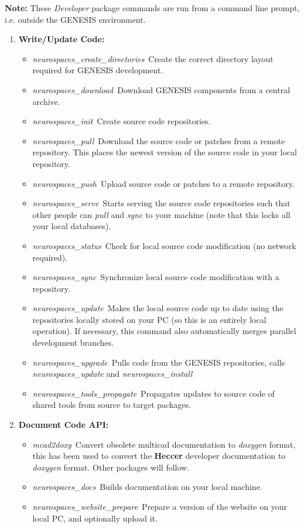 \documentclass[12pt]{article}
\begin{document}
{\bf Note:} These {\it Developer} package commands are run from a command line prompt, i.e. outside the GENESIS environment.

\begin{enumerate}
   \item {\bf Write/Update Code:}
   \begin{itemize}
      \item {\it neurospaces\_create\_directories}\,\,\,Create the correct directory layout required for GENESIS development.
      \item {\it neurospaces\_download}\,\,\,Download GENESIS components from a central archive.
      \item {\it neurospaces\_init}\,\,\,Create source code repositories.
      \item {\it neurospaces\_pull}\,\,\,Download the source code or patches from a remote repository. This places the newest version of the source 
      code in your local repository.
      \item {\it neurospaces\_push}\,\,\,Upload source code or patches to a remote repository.
      \item {\it neurospaces\_serve}\,\,\,Starts serving the source code repositories such that other people can {\it pull} and {\it sync} to your machine (note that this locks all your local databases).
      \item {\it neurospaces\_status}\,\,\,Check for local source code modification (no network required).
      \item {\it neurospaces\_sync}\,\,\,Synchronize local source code modification with a repository.
      \item {\it neurospaces\_update}\,\,\,Makes the local source code up to date using the repositories locally stored on your PC (so this is an entirely local operation). If necessary, this command also automatically merges parallel development branches.
      \item {\it neurospaces\_upgrade}\,\,\,Pulls code from the GENESIS repositories, calls {\it neurospaces\_update} and {\it neurospaces\_install}
      \item {\it neurospaces\_tools\_propagate}\,\,\,Propagates updates to source code of shared tools from source to target packages.
   \end{itemize}
  
   \item{\bf Document Code API:}
   \begin{itemize}
      \item {\it mcad2doxy}\,\,\,Convert obsolete multicad documentation to {\it doxygen} format, this has been used to convert the {\bf Heccer} 
      developer documentation to {\it doxygen} format. Other packages will follow.
      \item {\it neurospaces\_docs}\,\,\,Builds documentation on your local machine.
      \item {\it neurospaces\_website\_prepare}\,\,\,Prepare a version of the website on your local PC, and optionally upload it. 
   \end{itemize}
  

\end{enumerate}
\end{document}
